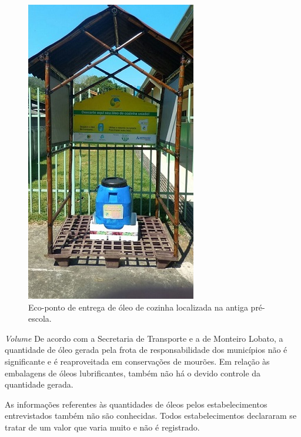 \begin{description}
	
	\begin{figure}
		\centering
		\includegraphics[width=0.75\linewidth]{produtos/prodtres/image095}
		\caption{Eco-ponto de entrega de óleo de cozinha localizada na antiga pré-escola.}
		\label{fig:image095}
	\end{figure}
	
	
	\subitem \textit{Volume} 
	De acordo com a Secretaria de Transporte e a  de Monteiro Lobato, a quantidade de óleo gerada pela frota de responsabilidade dos municípios não é significante e é reaproveitada em conservações de mourões. Em relação às embalagens de óleos lubrificantes, também não há o devido controle da quantidade gerada.
	
	As informações referentes às quantidades de óleos pelos estabelecimentos entrevistados também não são conhecidas. Todos estabelecimentos declararam se tratar de um valor que varia muito e não é registrado.
	

\end{description}
